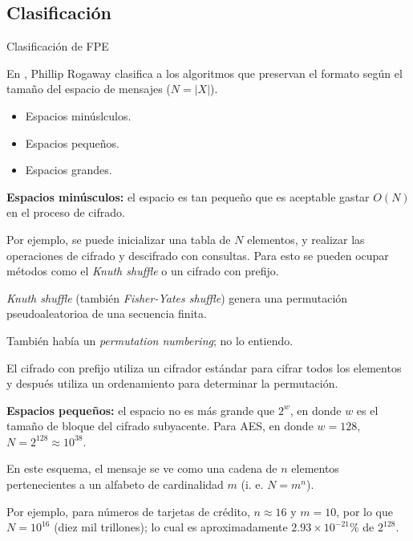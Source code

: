 %
%

\subsection{Clasificación}

\begin{frame}{Clasificación de FPE}

  En \cite{sinopsis_rogaway}, Phillip Rogaway clasifica a los algoritmos que
  preservan el formato según el tamaño del espacio de mensajes ($ N = |X| $).

  \begin{itemize}
    \item Espacios minúslculos.
    \item Espacios pequeños.
    \item Espacios grandes.
  \end{itemize}

  {
    \textbf{Espacios minúsculos:} el espacio es tan pequeño que es aceptable
    gastar $ O(N) $ en el proceso de cifrado.

    Por ejemplo, se puede inicializar una tabla de $ N $ elementos, y realizar
    las operaciones de cifrado y descifrado con consultas. Para esto se pueden
    ocupar métodos como el \textit{Knuth shuffle} o un cifrado con prefijo.
  }

  {
    \textit{Knuth shuffle} (también \textit{Fisher-Yates shuffle}) genera una
    permutación pseudoaleatorioa de una secuencia finita.

    También había un \textit{permutation numbering}; no lo entiendo.

    El cifrado con prefijo utiliza un cifrador estándar para cifrar todos los
    elementos y después utiliza un ordenamiento para determinar la permutación.
  }

  {
    \textbf{Espacios pequeños:} el espacio no es más grande que $ 2^w $, en
    donde $ w $ es el tamaño de bloque del cifrado subyacente. Para AES, en
    donde $ w = 128 $, $ N = 2^{128} \approx 10^{38} $.

    En este esquema, el mensaje se ve como una cadena de $ n $ elementos
    pertenecientes a un alfabeto de cardinalidad $ m $ (i. e. $ N = m^n $).

    Por ejemplo, para números de tarjetas de crédito, $ n \approx 16 $ y
    $ m = 10 $, por lo que $ N = 10^{16} $ (diez mil trillones); lo cual es
    aproximadamente $ 2.93 \times 10^{-21} \% $ de $ 2^{128} $.
  }


\end{frame}

